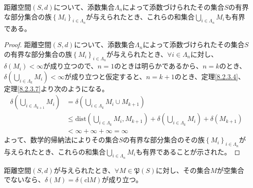 \documentclass[dvipdfmx]{jsarticle}
\begin{document}
\begin{thm}\label{8.2.3.8}
距離空間$(S,d)$について、添数集合$\varLambda_{n}$によって添数づけられたその集合$S$の有界な部分集合の族$\left\{ M_{i} \right\}_{i \in \varLambda_{n}}$が与えられたとき、これらの和集合$\bigcup_{i \in \varLambda_{n}} M_{i}$も有界である。
\end{thm}
\begin{proof}
距離空間$(S,d)$について、添数集合$\varLambda_{n}$によって添数づけられたその集合$S$の有界な部分集合の族$\left\{ M_{i} \right\}_{i \in \varLambda_{n}}$が与えられたとき、$\forall i \in \varLambda_{n}$に対し、$\delta\left( M_{i} \right) < \infty$が成り立つので、$n = 1$のときは明らかであるから、$n = k$のとき、$\delta\left( \bigcup_{i \in \varLambda_{k}} M_{i} \right) < \infty$が成り立つと仮定すると、$n = k + 1$のとき、定理\ref{8.2.3.4}、定理\ref{8.2.3.7}より次のようになる。
\begin{align*}
\delta\left( \bigcup_{i \in \varLambda_{k + 1}} M_{i} \right) &= \delta\left( \bigcup_{i \in \varLambda_{k}} M_{i} \cup M_{k + 1} \right)\\
&\leq \mathrm{dist}\left( \bigcup_{i \in \varLambda_{k}} M_{i},M_{k + 1} \right) + \delta\left( \bigcup_{i \in \varLambda_{k}} M_{i} \right) + \delta\left( M_{k + 1} \right)\\
&< \infty + \infty + \infty = \infty
\end{align*}
よって、数学的帰納法によりその集合$S$の有界な部分集合のその族$\left\{ M_{i} \right\}_{i \in \varLambda_{n}}$が与えられたとき、これらの和集合$\bigcup_{i \in \varLambda_{n}} M_{i}$も有界であることが示された。
\end{proof}
\begin{thm}\label{8.2.3.9}
距離空間$(S,d)$が与えられたとき、$\forall M \in \mathfrak{P}(S)$に対し、その集合$M$が空集合でないなら、$\delta(M) = \delta\left( {\mathrm{cl}}M \right)$が成り立つ。
\end{thm}
\end{document}
